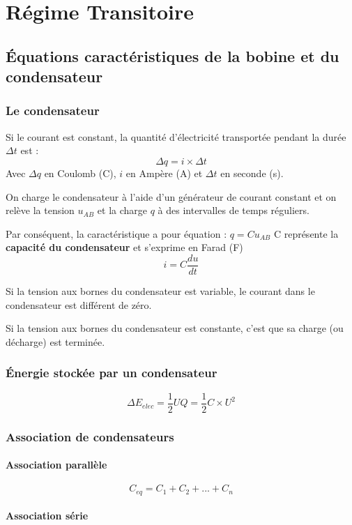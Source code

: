 \documentclass[a4paper,10pt]{article}
\begin{document}
\section{Régime Transitoire}
\subsection{Équations caractéristiques de la bobine et du condensateur}
\subsubsection{Le condensateur}
Si le courant est constant, la quantité d’électricité transportée pendant la durée $\Delta t$ est :
$$\Delta q = i \times \Delta t$$
Avec $\Delta q$ en Coulomb (C), $i$ en Ampère (A) et $\Delta t$ en seconde (s).

On charge le condensateur à l’aide d’un générateur de courant
constant et on relève la tension $u_{AB}$ et la charge $q$ à des
intervalles de temps réguliers.

Par conséquent, la caractéristique a pour équation : $q = C u_{AB}$ C représente la \textbf{capacité du condensateur} et s’exprime en
Farad (F)
$$i=C\frac{du}{dt}$$

Si la tension aux bornes du condensateur est variable, le courant dans le
condensateur est différent de zéro.

Si la tension aux bornes du condensateur est constante, c’est que sa charge
(ou décharge) est terminée.

\subsubsection{Énergie stockée par un condensateur}
$$\Delta E_{elec}=\frac{1}{2}UQ=\frac{1}{2}C\times U^2$$

\subsubsection{Association de condensateurs}

\paragraph{Association parallèle}

$$C_{eq}=C_1+C_2+...+C_n$$

\paragraph{Association série}
\end{document}
